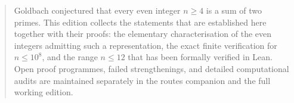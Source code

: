 \maketitle
\begin{abstract}
Goldbach conjectured that every even integer $n\geq4$ is a sum of two primes.
This edition collects the statements that are established here together with
their proofs: the elementary characterisation of the even integers admitting
such a representation, the exact finite verification for $n\leq10^{8}$, and the
range $n\leq12$ that has been formally verified in Lean.  Open proof
programmes, failed strengthenings, and detailed computational audits are
maintained separately in the routes companion and the full working edition.
\end{abstract}
